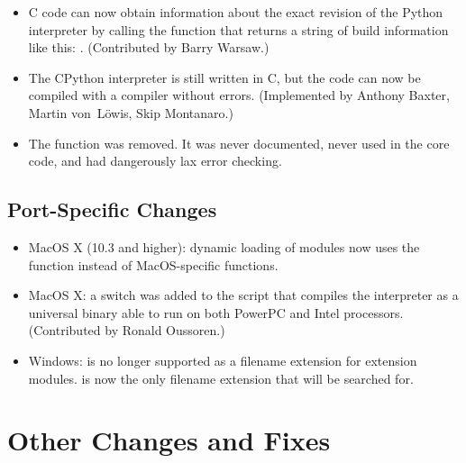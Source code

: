 \documentclass{howto}
\begin{document}
\begin{itemize}
\item C code can now obtain information about the exact revision
of the Python interpreter by calling the 
 function that returns a 
string of build information like this:
.  
(Contributed by Barry Warsaw.)

\item The CPython interpreter is still written in C, but 
the code can now be compiled with a {\Cpp} compiler without errors.  
(Implemented by Anthony Baxter, Martin von~L\"owis, Skip Montanaro.)

\item The  function was removed.  It was
never documented, never used in the core code, and had dangerously lax
error checking.

\end{itemize}


\subsection{Port-Specific Changes\label{ports}}

\begin{itemize}

\item MacOS X (10.3 and higher): dynamic loading of modules
now uses the  function instead of MacOS-specific
functions.

\item MacOS X: a  switch was added
to the  script that compiles the interpreter as a
universal binary able to run on both PowerPC and Intel processors.
(Contributed by Ronald Oussoren.)

\item Windows:  is no longer supported as a filename extension for 
extension modules.   is now the only filename extension that will
be searched for.

\end{itemize}


\section{Other Changes and Fixes \label{section-other}}
\end{document}
